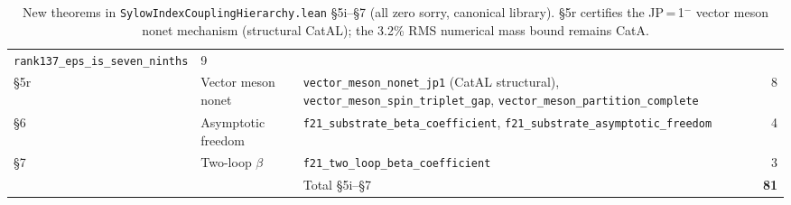 \documentclass[11pt,a4paper]{article}
\theoremstyle{definition}
\begin{document}
\begin{table}[h]
\begin{tabular}{@{}p{0.7cm}p{2.5cm}p{9.8cm}r@{}}
  \texttt{rank137\_\allowbreak eps\_\allowbreak is\_seven\_ninths} & 9 \\
§5r & Vector meson nonet &
  \texttt{vector\_\allowbreak meson\_\allowbreak nonet\_jp1} (CatAL structural),
  \texttt{vector\_\allowbreak meson\_\allowbreak spin\_\allowbreak triplet\_gap},
  \texttt{vector\_\allowbreak meson\_\allowbreak partition\_\allowbreak complete} & 8 \\
§6 & Asymptotic freedom & \texttt{f21\_\allowbreak substrate\_\allowbreak beta\_\allowbreak coefficient},
  \texttt{f21\_\allowbreak substrate\_\allowbreak asymptotic\_\allowbreak freedom} & 4 \\
§7 & Two-loop $\beta$ & \texttt{f21\_two\_\allowbreak loop\_beta\_\allowbreak coefficient} & 3 \\
\midrule
& & Total §5i–§7 & \textbf{81} \\
\bottomrule
\end{tabular}
\caption{New theorems in \texttt{SylowIndexCouplingHierarchy.lean} §5i–§7
  (all zero sorry, canonical library).
  §5r certifies the JP\,=\,1$^-$ vector meson nonet mechanism (structural CatAL);
  the 3.2\% RMS numerical mass bound remains CatA.}
\label{tab:sylow-f21}
\end{table}
\end{document}
